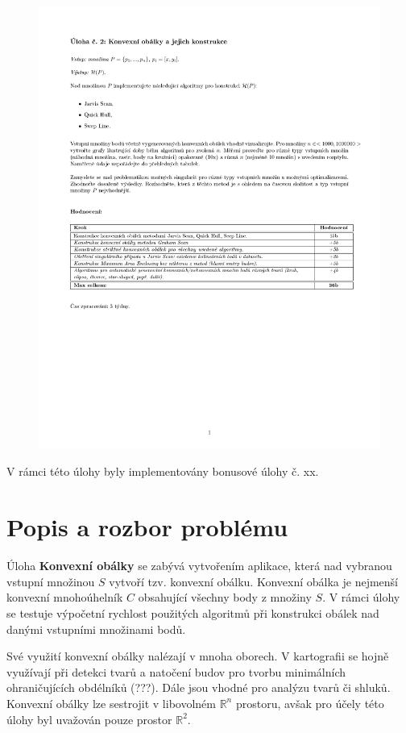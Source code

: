\documentclass[a4paper, 12pt]{article}
\begin{document}
\begin{figure}[h!]
	\includegraphics[clip, trim=0cm 10cm 0cm 3cm, width=1.0\textwidth]{./pictures/zadani02.pdf}
\end{figure}

V rámci této úlohy byly implementovány bonusové úlohy č. xx.
\clearpage

\section{Popis a rozbor problému}
Úloha \textbf{Konvexní obálky} se zabývá vytvořením aplikace, která nad vybranou vstupní množinou $S$ vytvoří tzv. konvexní obálku. Konvexní obálka je nejmenší konvexní mnohoúhelník $C$ obsahující všechny body z množiny $S$. V rámci úlohy se testuje výpočetní rychlost použitých algoritmů při konstrukci obálek nad danými vstupními množinami bodů. 

Své využití konvexní obálky nalézají v mnoha oborech. V kartografii se hojně využívají při detekci tvarů a natočení budov pro tvorbu minimálních ohraničujících obdélníků (???). Dále jsou vhodné pro analýzu tvarů či shluků. Konvexní obálky lze sestrojit v libovolném $\mathbb{R}^n$ prostoru, avšak pro účely této úlohy byl uvažován pouze prostor $\mathbb{R}^2$.
\end{document}
